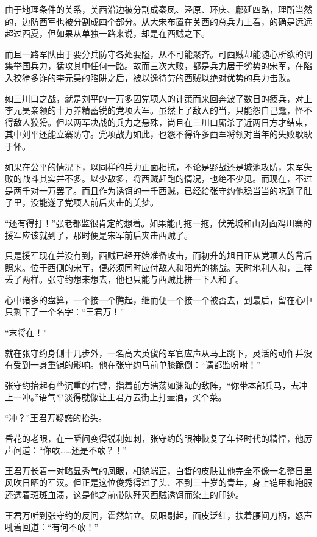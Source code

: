 由于地理条件的关系，关西沿边被分割成秦凤、泾原、环庆、鄜延四路，理所当然的，边防西军也被分割成四个部分。从大宋布置在关西的总兵力上看，的确是远远超过西夏，但如果从单独一路来说，却是在西贼之下。

而且一路军队由于要分兵防守各处要隘，从不可能聚齐。可西贼却能随心所欲的调集举国兵力，猛攻其中任何一路。故而三次大败，都是兵力居于劣势的宋军，在陷入狡猾多诈的李元昊的陷阱之后，被以逸待劳的西贼以绝对优势的兵力击败。

如三川口之战，就是刘平的一万多因党项人的计策而来回奔波了数日的疲兵，对上李元昊亲领的十万养精蓄锐的党项大军。虽然上了敌人的当，只能怨自己蠢，怪不得敌人狡猾。但以两军决战的兵力之悬殊，尚且在三川口厮杀了近两日方才结束，其中刘平还能立寨防守。党项战力如此，也怨不得许多西军将领对当年的失败耿耿于怀。

如果在公平的情况下，以同样的兵力正面相抗，不论是野战还是城池攻防，宋军失败的战斗其实并不多。以少敌多，将西贼赶跑的情况，也绝不少见。而现在，不过是两千对一万罢了。而且作为诱饵的一千西贼，已经给张守约他稳当当的吃到了肚子里，没能遂了党项人前后夹击的美梦。

“还有得打！”张老都监很肯定的想着。如果能再拖一拖，伏羌城和山对面鸡川寨的援军应该就到了，那时便是宋军前后夹击西贼了。

只是援军现在并没有到，西贼已经开始准备攻击，而初升的旭日正从党项人的背后照来。位于西侧的宋军，便必须同时应付敌人和阳光的挑战。天时地利人和，三样丢了两样。张守约想来想去，他也只能与西贼比拼一下人和了。

心中诸多的盘算，一个接一个腾起，继而便一个接一个被否去，到最后，留在心中只剩下了一个名字：“王君万！”

“末将在！”

就在张守约身侧十几步外，一名高大英俊的军官应声从马上跳下，灵活的动作并没有受到一身重铠的影响。他在张守约马前单膝跪倒：“请都监吩咐！”

张守约抬起有些沉重的右臂，指着前方浩荡如渊海的敌阵，“你带本部兵马，去冲上一冲。”语气平淡得就像让王君万去街上打壶酒，买个菜。

“冲？”王君万疑惑的抬头。

昏花的老眼，在一瞬间变得锐利如刺，张守约的眼神恢复了年轻时代的精悍，他厉声问道：“你敢……还是不敢？！”

王君万长着一对略显秀气的凤眼，相貌端正，白皙的皮肤让他完全不像一名整日里风吹日晒的军汉。但正是这位俊秀得过了头、不到三十岁的青年，身上铠甲和袍服还透着斑斑血渍，这是他之前带队歼灭西贼诱饵而染上的印迹。

王君万听到张守约的反问，霍然站立。凤眼剔起，面皮泛红，扶着腰间刀柄，怒声吼着回道：“有何不敢！”

